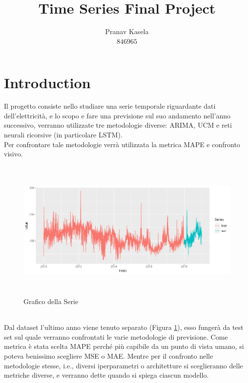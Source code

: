 \documentclass[12pt, onecolumn]{article}
\title{Time Series Final Project}
\author{Pranav Kasela \\$846965$}
\date{}
\begin{document}
\maketitle

\section*{Introduction}
Il progetto consiste nello studiare una serie temporale riguardante dati dell'elettricità, e lo scopo e fare una previsione sul suo andamento nell'anno successivo, verranno utilizzate tre metodologie diverse: ARIMA, UCM e reti neurali ricorsive (in particolare LSTM).\\
Per confrontare tale metodologie verrà utilizzata la metrica MAPE e confronto visivo.
\begin{figure}[!h]
  \centering
  \includegraphics[width=\linewidth, height=7cm]{imgs/Series.png}
  \caption{Grafico della Serie}
  \label{fig:series}
\end{figure}\\
Dal dataset l'ultimo anno viene tenuto separato (Figura \ref{fig:series}), esso fungerà da test set sul quale verranno confrontati le varie metodologie di previsione.
Come metrica è stata scelta MAPE perché più capibile da un punto di vista umano, si poteva benissimo scegliere MSE o MAE.
Mentre per il confronto nelle metodologie stesse, i.e., diversi iperparametri o architetture si sceglieranno delle metriche diverse, e verranno dette quando si spiega ciascun modello.
\end{document}
